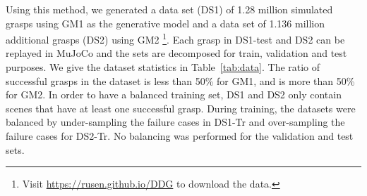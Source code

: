Using this method, we generated a data set (DS1) of 1.28 million simulated grasps using GM1 as the generative model and a data set of 1.136 million additional grasps (DS2) using GM2 \footnote{Visit \href{https://rusen.github.io/DDG/}{https://rusen.github.io/DDG} to download the data.}. Each grasp in DS1-test and DS2 can be replayed in MuJoCo and the sets are decomposed for train, validation and test purposes. We give the dataset statistics in Table~\ref{tab:data}. The ratio of successful grasps in the dataset is less than 50\% for GM1, and is more than 50\% for GM2. In order to have a balanced training set, DS1 and DS2 only contain scenes that have at least one successful grasp. During training, the datasets were balanced by under-sampling the failure cases in DS1-Tr and over-sampling the failure cases for DS2-Tr. No balancing was performed for the validation and test sets.
\begin{table}[htbp]
\centering
\caption{Statistics of the simulated data sets.}
\label{tab:data}
\end{table}

